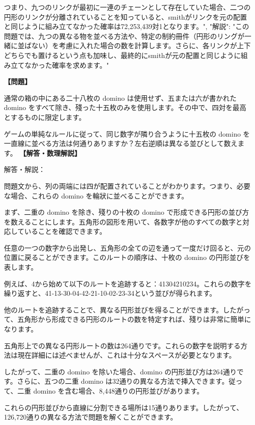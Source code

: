 \documentclass[10pt,a4paper,oneside,openany]{ltjsbook}
\begin{document}
\begin{tcolorbox}[colback=softblue,colframe=primaryblue,title=\textbf{第 282 問：THE ANTIQUARY'S CHAIN.},arc=2mm,boxrule=1pt,breakable]
{つまり、九つのリンクが最初に一連のチェーンとして存在していた場合、二つの円形のリンクが分離されていることを知っていると、smithがリンクを元の配置と同じように組み立てなかった確率は72,253,439対1となります。",
"解説": "この問題では、九つの異なる物を並べる方法や、特定の制約冊件（円形のリングが一緒に並ばない）を考慮に入れた場合の数を計算します。さらに、各リンクが上下どちらでも置けるという点も加味し、最終的にsmithが元の配置と同じように組み立てなかった確率を求めます。"
}
\end{tcolorbox}

\begin{tcolorbox}[colback=softblue,colframe=primaryblue,title=\textbf{第 283 問：十五枚の Domino の並び方 （原題: THE FIFTEEN DOMINOES.）},arc=2mm,boxrule=1pt,breakable]
\textbf{【問題】}\par\vspace{0.3em}
通常の箱の中にある二十八枚の domino は使用せず、五または六が書かれた domino をすべて除き、殘った十五枚のみを使用します。その中で、四対を最高とするものに限定します。

ゲームの単純なルールに従って、同じ数字が隣り合うように十五枚の domino を一直線に並べる方法は何通りありますか？左右逆順は異なる並びとして数えます。
\tcblower
\textbf{【解答・数理解説】}\par\vspace{0.3em}
解答・解説：

問題文から、列の両端には四が配置されていることがわかります。つまり、必要な場合、これらの domino を輪狀に並べることができます。

まず、二重の domino を除き、殘りの十枚の domino で形成できる円形の並び方を数えることにします。五角形の図形を用いて、各数字が他のすべての数字と対応していることを確認できます。

任意の一つの数字から出発し、五角形の全ての辺を通って一度だけ回ると、元の位置に戻ることができます。このルートの順序は、十枚の domino の円形並びを表します。

例えば、4から始めて以下のルートを追跡すると：41304210234。これらの数字を繰り返すと、41-13-30-04-42-21-10-02-23-34という並びが得られます。

他のルートを追跡することで、異なる円形並びを得ることができます。したがって、五角形から形成できる円形のルートの数を特定すれば、殘りは非常に簡単になります。

五角形上での異なる円形ルートの数は264通りです。これらの数字を説明する方法は現在詳細には述べませんが、これは十分なスペースが必要となります。

したがって、二重の domino を除いた場合、domino の円形並び方は264通りです。さらに、五つの二重 domino は32通りの異なる方法で挿入できます。従って、二重 domino を含む場合、8,448通りの円形並びがあります。

これらの円形並びから直線に分割できる場所は15通りあります。したがって、126,720通りの異なる方法で問題を解くことができます。
\end{tcolorbox}
\end{document}
